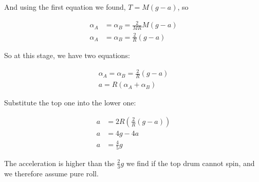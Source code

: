 \documentclass[8.01x]{subfiles}
\begin{document}
And using the first equation we found, $T = M(g - a)$, so

\begin{align}
\alpha_A &= \alpha_B = \frac{2}{M R} M(g - a)\\
\alpha_A &= \alpha_B = \frac{2}{R} (g - a)
\end{align}

So at this stage, we have two equations:

\begin{align}
\alpha_A = \alpha_B = \frac{2}{R} (g - a)\\
a = R(\alpha_A + \alpha_B)
\end{align}

Substitute the top one into the lower one:

\begin{align}
a &= 2 R(\frac{2}{R} (g - a))\\
a &= 4 g - 4 a\\
a &= \frac{4}{5} g
\end{align}

The acceleration is higher than the $\frac{2}{3} g$ we find if the top drum cannot spin, and we therefore assume pure roll.
\end{document}
